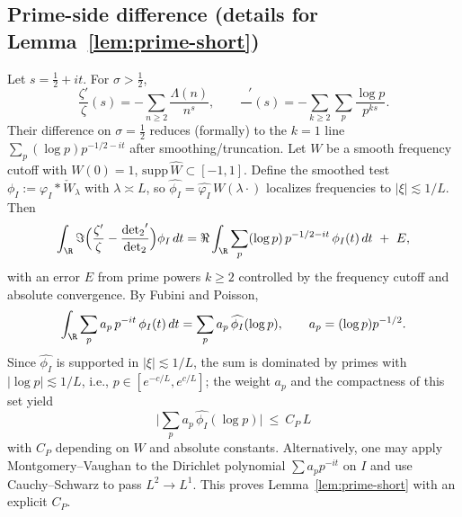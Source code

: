 \documentclass[11pt]{article}
\theoremstyle{remark}
\DeclareMathOperator{\dettwo}{det_2}
\begin{document}
\subsection{Prime-side difference (details for Lemma~\ref{lem:prime-short})}
Let \(s=\tfrac12+it\). For \(\sigma>\tfrac12\),
\[\frac{\zeta'}{\zeta}(s)= -\sum_{n\ge 2}\frac{\Lambda(n)}{n^s},\qquad \frac{\dettwo'}{\dettwo}(s)= -\sum_{k\ge 2}\sum_{p}\frac{\log p}{p^{ks}}.\]
Their difference on \(\sigma=\tfrac12\) reduces (formally) to the \(k=1\) line \(\sum_p (\log p) p^{-1/2-it}\) after smoothing/truncation. Let \(W\) be a smooth frequency cutoff with \(W(0)=1\), \(\mathrm{supp}\,\widehat W\subset[-1,1]\). Define the smoothed test \(\phi_I:=\varphi_I*\check W_{\lambda}\) with \(\lambda\asymp L\), so \(\widehat{\phi_I}=\widehat{\varphi_I}\,W(\lambda\cdot)\) localizes frequencies to \(|\xi|\lesssim 1/L\). Then
\[\int_{\R}\Im\Big(\frac{\zeta'}{\zeta}-\frac{\dettwo'}{\dettwo}\Big)\phi_I\,dt=\Re\int_{\R}\sum_{p}(\log p)\,p^{-1/2-it}\,\phi_I(t)\,dt\ +\ E,\]
with an error \(E\) from prime powers \(k\ge 2\) controlled by the frequency cutoff and absolute convergence. By Fubini and Poisson,
\[\int_{\R}\sum_{p}a_p\,p^{-it}\,\phi_I(t)\,dt=\sum_{p}a_p\,\widehat{\phi_I}(\log p),\qquad a_p=(\log p) p^{-1/2}.\]
Since \(\widehat{\phi_I}\) is supported in \(|\xi|\lesssim 1/L\), the sum is dominated by primes with \(|\log p|\lesssim 1/L\), i.e., \(p\in[e^{-c/L},e^{c/L}]\); the weight \(a_p\) and the compactness of this set yield
\[\Big|\sum_{p}a_p\,\widehat{\phi_I}(\log p)\Big|\ \le\ C_P\,L\]
with \(C_P\) depending on \(W\) and absolute constants. Alternatively, one may apply Montgomery–Vaughan to the Dirichlet polynomial \(\sum a_p p^{-it}\) on \(I\) and use Cauchy–Schwarz to pass \(L^2\to L^1\). This proves Lemma~\ref{lem:prime-short} with an explicit \(C_P\).
\end{document}
